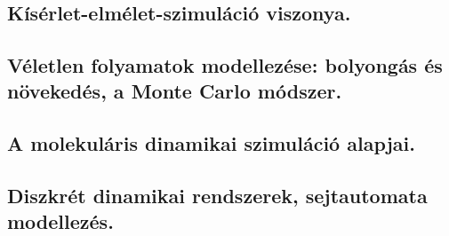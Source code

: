 \section{}
\subsection{Kísérlet-elmélet-szimuláció viszonya.}

\subsection{Véletlen folyamatok modellezése: bolyongás és növekedés, a Monte Carlo módszer.}

\subsection{A molekuláris dinamikai szimuláció alapjai.}

\subsection{Diszkrét dinamikai rendszerek, sejtautomata modellezés.}

